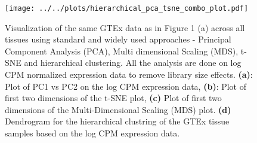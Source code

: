 \documentclass[10pt,letterpaper]{article}
\begin{document}
\begin{figure}[!h]
\texttt{[image: ../../plots/hierarchical\_pca\_tsne\_combo\_plot.pdf]}
\caption{Visualization of the same GTEx data as in Figure 1 (a) across all tissues using standard and widely used approaches - Principal Component Analysis (PCA), Multi dimensional Scaling (MDS), t-SNE and hierarchical clustering.
All the analysis are done on log CPM normalized expression data to remove library size effects. \textbf{(a)}: Plot of PC1 vs PC2 on the log CPM expression data, \textbf{(b)}: Plot of first two dimensions of the t-SNE plot, \textbf{(c)} Plot of first two dimensions of the Multi-Dimensional Scaling (MDS) plot. \textbf{(d)} Dendrogram for the hierarchical clustring of the GTEx tissue samples based on the log CPM expression data.}
\label{fig:fig2}
\end{figure}
\end{document}
